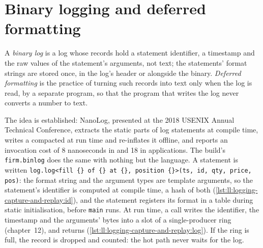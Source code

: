 \section{Binary logging and deferred formatting}

\begin{definition}\label{def:ll:logging-capture-and-replay:binlog}
A \emph{binary log} is a log whose records hold a statement identifier, a timestamp and the raw values of the
statement's arguments, not text; the statements' format strings are stored once, in the log's header or alongside the binary.
\emph{Deferred formatting} is the practice of turning such records into text only when the log is
read, by a separate program, so that the program that writes the log never converts a number to text.
\end{definition}

The idea is established: NanoLog, presented at the 2018 USENIX Annual Technical Conference, extracts the static parts of log
statements at compile time, writes a compacted  at run time and re-inflates it offline, and reports an invocation
cost of 8 nanoseconds in  and 18 in applications. The build's \texttt{firm.binlog} does the same with nothing
but the language. A statement is written \texttt{log.log<\textquotedbl{}fill \{\} of \{\} at \{\}, position \{\}\textquotedbl{}>(ts, id, qty, price, pos)}: the format
string and the argument types are template arguments, so the statement's identifier is computed at compile time, a hash of both
(\cref{lst:ll:logging-capture-and-replay:id}), and the statement registers its format in a table during static initialisation,
before \texttt{main} runs. At run time, a call writes the identifier, the timestamp and the arguments' bytes into a slot of a
single-producer ring (chapter~12), and returns (\cref{lst:ll:logging-capture-and-replay:log}). If the ring is full, the record
is dropped and counted: the hot path never waits for the log.

\label{lst:ll:logging-capture-and-replay:id}

\label{lst:ll:logging-capture-and-replay:log}

